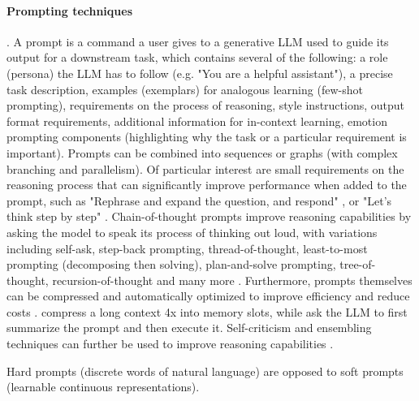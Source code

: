 \documentclass{article}
\begin{document}
\paragraph{Prompting techniques}. A prompt is a command a user gives to a generative LLM used to guide its output for a downstream task, which contains several of the following: a role (persona) the LLM has to follow (e.g. "You are a helpful assistant"), a precise task description, examples (exemplars) for analogous learning (few-shot prompting), requirements on the process of reasoning, style instructions, output format requirements, additional information for in-context learning, emotion prompting components (highlighting why the task or a particular requirement is important). Prompts can be combined into sequences or graphs (with complex branching and parallelism). Of particular interest are small requirements on the reasoning process that can significantly improve performance when added to the prompt, such as "Rephrase and expand the question, and respond" \cite{}, or "Let’s think step by step" \cite{kojima2022}. Chain-of-thought prompts improve reasoning capabilities by asking the model to speak its process of thinking out loud, with variations including self-ask, step-back prompting, thread-of-thought, least-to-most prompting (decomposing then solving), plan-and-solve prompting, tree-of-thought, recursion-of-thought and many more \cite{schulhoff2024prompt}. 
Furthermore, prompts themselves can be compressed and automatically optimized to improve efficiency and reduce costs \cite{chang2024efficient}. \cite{ge2023context} compress a long context 4x into memory slots, while \cite{weston2023system} ask the LLM to first summarize the prompt and then execute it. Self-criticism and ensembling techniques can further be used to improve reasoning capabilities \cite{schulhoff2024prompt}. 

Hard prompts (discrete words of natural language) are opposed to soft prompts (learnable continuous representations). 
\end{document}
